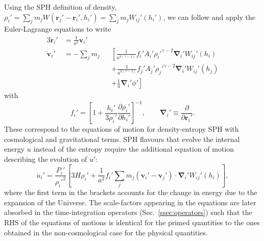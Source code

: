 Using the SPH definition of density,
$\rho_i' = \sum_jm_jW(\mathbf{r}_{j}'-\mathbf{r}_{i}',h_i') =
\sum_jm_jW_{ij}'(h_i')$, we can follow \cite{Price2012} and apply the
Euler-Lagrange equations to write
\begin{alignat}{3}
  \dot{\mathbf{r}}_i'&= \frac{1}{a^2} \mathbf{v}_i'&  \label{eq:cosmo_eom_r} \\
  \dot{\mathbf{v}}_i' &= -\sum_j m_j &&\left[\frac{1}{a^{3(\gamma-1)}}f_i'A_i'\rho_i'^{\gamma-2}\mathbf{\nabla}_i'W_{ij}'(h_i)\right. \nonumber\\
  &   && + \left. \frac{1}{a^{3(\gamma-1)}}f_j'A_j'\rho_j'^{\gamma-2}\mathbf{\nabla}_i'W_{ij}'(h_j)\right. \nonumber\\
  &   && + \left. \frac{1}{a}\mathbf{\nabla}_i'\phi'\right] \label{eq:cosmo_eom_v}
\end{alignat}
with
\begin{equation}
    f_i' = \left[1 + \frac{h_i'}{3\rho_i'}\frac{\partial
      \rho_i'}{\partial h_i'}\right]^{-1}, \qquad \mathbf{\nabla}_i'
  \equiv \frac{\partial}{\partial \mathbf{r}_{i}'}. \nonumber
\end{equation}
These correspond to the equations of motion for density-entropy SPH
\citep[e.g. eq. 14 of][]{Hopkins2013} with cosmological and
gravitational terms. SPH flavours that evolve the internal energy $u$ instead of the
entropy require the additional equation of motion describing the evolution of
$u'$:
\begin{equation}
  \dot{u}_i' = \frac{P_i'}{\rho_i'^2}\left[3H\rho_i' + \frac{1}{a^2}f_i'\sum_jm_j\left(\mathbf{v}_i' -
    \mathbf{v}_j'\right)\cdot\mathbf{\nabla}_i'W_{ij}'(h_i)\right],
  \label{eq:cosmo_eom_u}
\end{equation}
where the first term in the brackets accounts for the change in energy
due to the expansion of the Universe. The scale-factors appearing in
the equations are later absorbed in the time-integration operators
(Sec.~\ref{ssec:operators}) such that the RHS of the equations of
motions is identical for the primed quantities to the ones obtained in
the non-cosmological case for the physical quantities.

